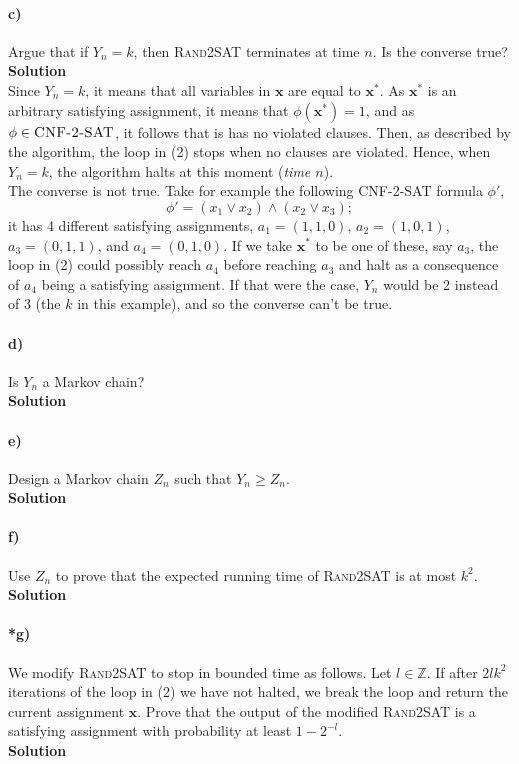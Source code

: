\documentclass[10pt]{article}
\begin{document}
\paragraph{c)} Argue that if $Y_n=k$, then \textsc{Rand2SAT} terminates at time $n$. Is the converse true?\\
\textbf{Solution}\\
Since $Y_n=k$, it means that all variables in $\textbf{x}$ are equal to $\textbf{x}^*$. As $\textbf{x}^*$ is an arbitrary satisfying assignment, it means that $\phi(\textbf{x}^*)=1$, and as $\phi\in\textsc{CNF-2-SAT}$, it follows that is has no violated clauses. Then, as described by the algorithm, the loop in (2) stops when no clauses are violated. Hence, when $Y_n=k$, the algorithm halts at this moment (\textit{time $n$}).\\
The converse is not true. Take for example the following \textsc{CNF-2-SAT} formula $\phi'$, \[\phi'=(x_1\vee x_2)\wedge(x_2\vee x_3);\] it has 4 different satisfying assignments, $a_1=(1,1,0)$, $a_2=(1,0,1)$, $a_3=(0,1,1)$, and $a_4=(0,1,0)$. If we take $\textbf{x}^*$ to be one of these, say $a_3$, the loop in (2) could possibly reach $a_4$ before reaching $a_3$ and halt as a consequence of $a_4$ being a satisfying assignment. If that were the case, $Y_n$ would be 2 instead of 3 (the $k$ in this example), and so the converse can't be true.

\paragraph{d)} Is $Y_n$ a Markov chain?\\
\textbf{Solution}\\

\paragraph{e)} Design a Markov chain $Z_n$ such that $Y_n\geq Z_n$.\\ %
\textbf{Solution}\\

\paragraph{f)} Use $Z_n$ to prove that the expected running time of \textsc{Rand2SAT} is at most $k^2$.\\
\textbf{Solution}\\

\paragraph{*g)} We modify \textsc{Rand2SAT} to stop in bounded time as follows. Let $l\in\mathbb{Z}$. If after $2lk^2$ iterations of the loop in (2) we have not halted, we break the loop and return the current assignment $\textbf{x}$. Prove that the output of the modified \textsc{Rand2SAT} is a satisfying assignment with probability at least $1-2^{-l}$.\\ %
\textbf{Solution}\\
\end{document}
